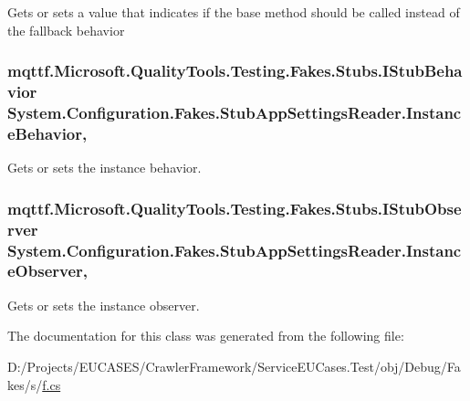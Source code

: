 Gets or sets a value that indicates if the base method should be called instead of the fallback behavior

\hypertarget{class_system_1_1_configuration_1_1_fakes_1_1_stub_app_settings_reader_aa322b1c5e878d69070151138e8352c2c}{
\subsubsection[{Instance\-Behavior}]{\setlength{\rightskip}{0pt plus 5cm}mqttf.\-Microsoft.\-Quality\-Tools.\-Testing.\-Fakes.\-Stubs.\-I\-Stub\-Behavior System.\-Configuration.\-Fakes.\-Stub\-App\-Settings\-Reader.\-Instance\-Behavior\hspace{0.3cm}{\ttfamily [get]}, {\ttfamily [set]}}}\label{class_system_1_1_configuration_1_1_fakes_1_1_stub_app_settings_reader_aa322b1c5e878d69070151138e8352c2c}


Gets or sets the instance behavior.

\hypertarget{class_system_1_1_configuration_1_1_fakes_1_1_stub_app_settings_reader_ab40906ad397156fa5cc1a6600ff17846}{
\subsubsection[{Instance\-Observer}]{\setlength{\rightskip}{0pt plus 5cm}mqttf.\-Microsoft.\-Quality\-Tools.\-Testing.\-Fakes.\-Stubs.\-I\-Stub\-Observer System.\-Configuration.\-Fakes.\-Stub\-App\-Settings\-Reader.\-Instance\-Observer\hspace{0.3cm}{\ttfamily [get]}, {\ttfamily [set]}}}\label{class_system_1_1_configuration_1_1_fakes_1_1_stub_app_settings_reader_ab40906ad397156fa5cc1a6600ff17846}


Gets or sets the instance observer.



The documentation for this class was generated from the following file\-:\begin{DoxyCompactItemize}
\item 
D\-:/\-Projects/\-E\-U\-C\-A\-S\-E\-S/\-Crawler\-Framework/\-Service\-E\-U\-Cases.\-Test/obj/\-Debug/\-Fakes/s/\hyperlink{s_2f_8cs}{f.\-cs}\end{DoxyCompactItemize}
